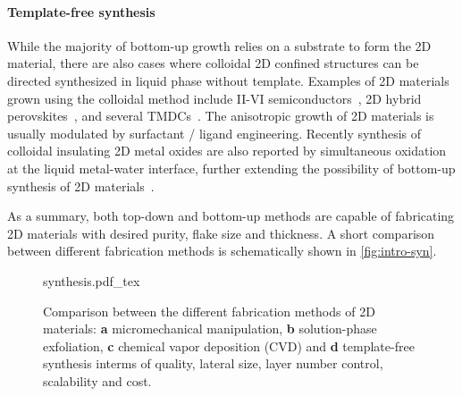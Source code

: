 \paragraph{Template-free synthesis}
While the majority of bottom-up growth relies on a substrate to form
the 2D material, there are also cases where colloidal 2D confined
structures can be directed synthesized in liquid phase without
template. Examples of 2D materials grown using the colloidal method
include II-VI semiconductors~\autocite{Riedinger_2017_2D}, 2D hybrid
perovskites~\autocite{Jagielski_2017_SA}, and
several TMDCs~\autocite{Altavilla_2011,Plashnitsa_2012_mos2_wet}. The
anisotropic growth of 2D materials is usually modulated by surfactant
/ ligand
engineering\autocite{Riedinger_2017_2D,Jagielski_2017_SA}. Recently synthesis of
colloidal insulating 2D metal oxides are also reported by
simultaneous oxidation at the liquid metal-water interface, further
extending the possibility of bottom-up synthesis of 2D
materials~\autocite{Zavabeti_2017_GaOx}.

As a summary, both top-down and bottom-up methods are capable of
fabricating 2D materials with desired purity, flake size and
thickness. A short comparison between different fabrication methods is
schematically shown in \autoref{fig:intro-syn}.

\begin{figure}[h]
  \centering
  {synthesis.pdf_tex}
  \caption{\label{fig:intro-syn}%
    Comparison between the different fabrication methods of 2D
    materials: \textbf{a} micro\-mechanical manipulation, \textbf{b}
    solution-phase exfoliation, \textbf{c} chemical vapor deposition
    (CVD) and \textbf{d} template-free synthesis interms of quality, lateral size, layer number control, scalability and cost.
  }
\end{figure}



